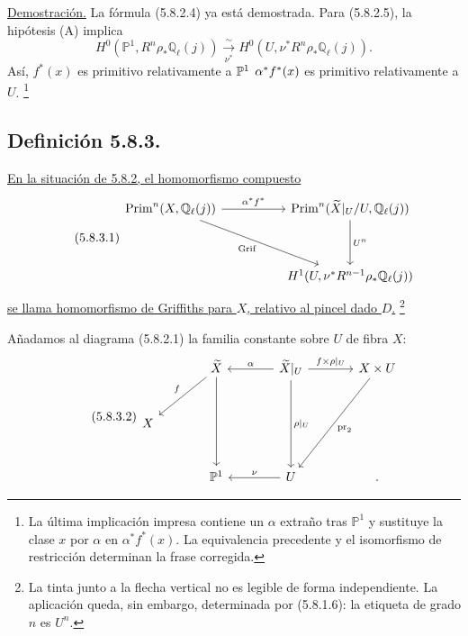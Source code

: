\noindent\underline{Demostración.}
La fórmula (5.8.2.4) ya está demostrada. Para (5.8.2.5), la hipótesis
(A) implica
\[
H^0(\mathbb P^1,R^n\rho_*\mathbb Q_\ell(j))
\xrightarrow[\nu^*]{\sim}
H^0(U,\nu^*R^n\rho_*\mathbb Q_\ell(j)).
\]
Así, \sisi{[}{}$f^*(x)$ es primitivo relativamente a
$\mathbb P^1$\sisi{]}{}
$\alpha^*f^*(x)$ es primitivo relativamente a $U$.
\footnote{La última implicación impresa contiene un $\alpha$ extraño
tras $\mathbb P^1$ y sustituye la clase $x$ por $\alpha$ en
$\alpha^*f^*(x)$. La equivalencia precedente y el isomorfismo de
restricción determinan la frase corregida.}

\subsection*{Definición 5.8.3.}
\underline{En la situación de 5.8.2, el homomorfismo compuesto}
\begin{equation}\tag{5.8.3.1}
\begin{tikzcd}[column sep=huge,row sep=huge]
\operatorname{Prim}^n(X,\mathbb Q_\ell(j))
  \arrow[r,"\alpha^*f^*"]
  \arrow[dr,"\operatorname{Grif}"']
&
\operatorname{Prim}^n(\widetilde X|_U/U,\mathbb Q_\ell(j))
  \arrow[d,"U^n"]
\\
{}
&
H^1(U,\nu^*R^{n-1}\rho_*\mathbb Q_\ell(j))
\end{tikzcd}
\end{equation}
\underline{se llama homomorfismo de Griffiths para $X$, relativo al
pincel dado $D$.}
\footnote{La tinta junto a la flecha vertical no es legible de forma
independiente. La aplicación queda, sin embargo, determinada por
(5.8.1.6): la etiqueta de grado $n$ es $U^n$.}

\pageoriginale

Añadamos al diagrama (5.8.2.1) la familia constante sobre $U$ de fibra
$X$:
\begin{equation}\tag{5.8.3.2}
\begin{tikzcd}[row sep=large,column sep=large]
{}
&
\widetilde X
  \arrow[dl,"f"']
  \arrow[dd]
&
\widetilde X|_U
  \arrow[l,"\alpha"']
  \arrow[r,"f\times\rho|_U"]
  \arrow[dd,"\rho|_U"]
&
X\times U
  \arrow[ddl,"\operatorname{pr}_2"]
\\
X&{}&{}&{}
\\
{}
&
\mathbb P^1
&
U\arrow[l,"\nu"']
&
.
\end{tikzcd}
\end{equation}

